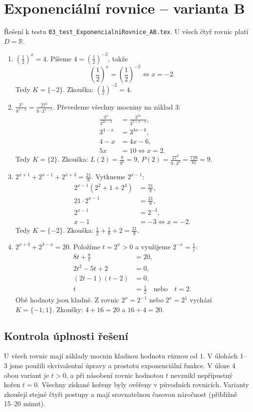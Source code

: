 \documentclass[a4paper,10pt]{article}
\begin{document}
\section*{Exponenciální rovnice -- varianta B}
Řešení k testu \texttt{03\_test\_ExponencialniRovnice\_AB.tex}.
U všech čtyř rovnic platí $D=\mathbb{R}$.
\begin{enumerate}
\item $\displaystyle \left(\frac12\right)^x=4$.
Píšeme $4=(\frac12)^{-2}$, takže
\[
\left(\frac12\right)^x=\left(\frac12\right)^{-2}\iff x=-2.
\]
Tedy $K=\{-2\}$. Zkouška: $(\frac12)^{-2}=4$.

\item $\displaystyle \frac{3^x}{9^{x-2}}=\frac{27^x}{9\cdot3^{4-x}}$.
Převedeme všechny mocniny na základ $3$:
\begin{align*}
\frac{3^x}{3^{2x-4}}&=\frac{3^{3x}}{3^{2+4-x}},\\
3^{4-x}&=3^{4x-6},\\
4-x&=4x-6,\\
5x&=10 \iff x=2.
\end{align*}
Tedy $K=\{2\}$. Zkouška: $L(2)=\frac9{9^0}=9$,
$P(2)=\frac{27^2}{9\cdot3^2}=\frac{729}{81}=9$.

\item $\displaystyle 2^{x+1}+2^{x-1}+2^{x+3}=\frac{21}{8}$.
Vytkneme $2^{x-1}$:
\begin{align*}
2^{x-1}\left(2^2+1+2^4\right)&=\frac{21}{8},\\
21\cdot2^{x-1}&=\frac{21}{8},\\
2^{x-1}&=2^{-3},\\
x-1&=-3 \iff x=-2.
\end{align*}
Tedy $K=\{-2\}$. Zkouška: $\frac12+\frac18+2=\frac{21}{8}$.

\item $\displaystyle 2^{x+3}+2^{3-x}=20$.
Položíme $t=2^x>0$ a využijeme $2^{-x}=\frac1t$:
\begin{align*}
8t+\frac8t&=20,\\
2t^2-5t+2&=0,\\
(2t-1)(t-2)&=0,\\
t&=\frac12\quad\text{nebo}\quad t=2.
\end{align*}
Obě hodnoty jsou kladné. Z rovnic $2^x=2^{-1}$ nebo $2^x=2^1$ vychází
$K=\{-1;1\}$. Zkoušky: $4+16=20$ a $16+4=20$.
\end{enumerate}

\subsection*{Kontrola úplnosti řešení}
U všech rovnic mají základy mocnin kladnou hodnotu různou od $1$.
V úlohách 1--3 jsme použili ekvivalentní úpravy a prostotu exponenciální funkce.
V úloze 4 obou variant je $t>0$, a při násobení rovnic hodnotou $t$
nevznikl nepřípustný kořen $t=0$. Všechny získané kořeny byly ověřeny
v původních rovnicích. Varianty zkoušejí stejné čtyři postupy a mají
srovnatelnou časovou náročnost (přibližně 15--20 minut).
\end{document}
